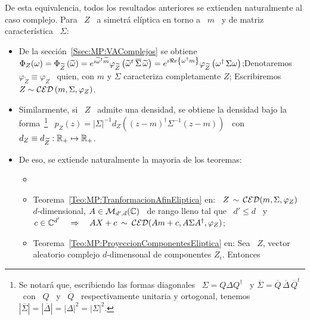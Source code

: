 De esta equivalencia, todos  los resultados anteriores se extienden naturalmente
al caso  complejo. Para \ $Z$ \  a simetr\'a el\'iptica en  torno a \ $m$  \ y de
matriz caracter\'istica \ $\Sigma$:
%
\begin{itemize}
\item  De la  secci\'on~\ref{Ssec:MP:VAComplejos} se  obtiene  $\Phi_Z(\omega) =
  \Phi_{\widetilde{Z}}\left(    \widetilde{\omega}     \right)    =    e^{\imath
    \widetilde{\omega}^t       \widetilde{m}}      \varphi_{\widetilde{Z}}\left(
    \widetilde{\omega}^t  \, \overline{\Sigma}  \, \widetilde{\omega}  \right) =
  e^{\imath  \Re e \left\{ \omega^\dag m \right\}} \varphi_{\widetilde{Z}}\left(  \omega^\dag \,
    \Sigma \omega  \right)$;\newline Denotaremos $\varphi_{\widetilde{Z}} \equiv
  \varphi_Z$ \ quien, con  $m$ y $\Sigma$ caracteriza completamente $Z$;\newline
  Escribiremos $Z \sim \mathcal{CED}\left( m , \Sigma , \varphi_Z \right)$.
%
\item Similarmente, si \ $Z$ \  admite una densidad, se obtiene la densidad bajo
  la  forma~\footnote{Se  notar\'a  que,  escribiendo las  formas  diagonales  \
    $\Sigma  =  Q  \Delta  Q^\dag$  \ y  $\overline{\Sigma}  =  \overline{Q}  \,
    \overline{\Delta}  \, \overline{Q}^t$ \  con \  $Q$ \  y \  $\overline{Q}$ \
    respectivamente  unitaria y ortogonal,  tenemos \  $\left| \overline{\Sigma}
    \right|  = \left|  \overline{\Delta}  \right| =  \left|  \Delta \right|^2  =
    \left| \Sigma  \right|^2$.}  \ $p_Z(z) =  |\Sigma|^{-1} d_Z\left( (z-m)^\dag
    \Sigma^{-1} (z-m)  \right)$ \ con  \ $d_Z \equiv  d_{\widetilde{Z}}: \mathbb{R}_+
  \mapsto \mathbb{R}_+$.
%
\item  De eso,  se extiende  naturalmente la mayoria de los teoremas:
%
  \begin{itemize}
  \item  {}~\cite{Kri76}
  \item  Teorema~\ref{Teo:MP:TranformacionAfinEliptica}  en:  \  $Z \,  \sim  \,
    \mathcal{CED}(m,\Sigma,\varphi_Z)$ \  $d$-dimensional, $A \in  \mathcal{M}_{d',d}(\mathbb{C})$ \ de
    rango lleno tal que  \ $d' \le d$ \ y \  $c \in \mathbb{C}^{d'} \quad \Rightarrow
    \quad A X + c \: \sim \: \mathcal{CED}(A m + c , A \Sigma A^\dag , \varphi_Z)$;
  \item Teorema~\ref{Teo:MP:ProyeccionComponentesEliptica} en: Sea \ $Z$, vector
    aleatorio   complejo   $d$-dimensonal   de   componentes   $Z_i$.   Entonces

\end{itemize}
\end{itemize}
